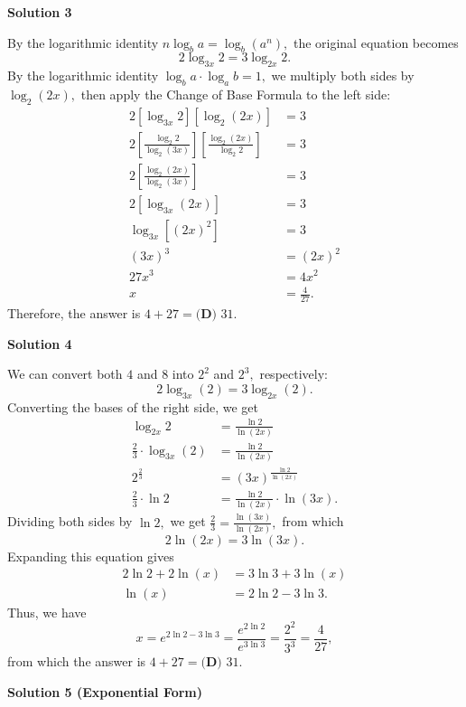\begin{enumerate}
\textbf{Solution 3}

By the logarithmic identity $n\log_b{a}=\log_b{\left(a^n\right)},$ the original equation becomes 
 \[2\log_{3x} 2 = 3\log_{2x} 2.\]By the logarithmic identity $\log_b{a}\cdot\log_a{b}=1,$ we multiply both sides by $\log_2{(2x)},$ then apply the Change of Base Formula to the left side:
 \begin{align*} 2\left[\log_{3x}2\right]\left[\log_2{(2x)}\right] &= 3 \\ 2\left[\frac{\log_2 2}{\log_2{(3x)}}\right]\left[\frac{\log_2{(2x)}}{\log_2 2}\right] &= 3 \\ 2\left[\frac{\log_2{(2x)}}{\log_2{(3x)}}\right] &=3 \\ 2\left[\log_{3x}{(2x)}\right] &= 3 \\ \log_{3x}{\left[(2x)^2\right]} &= 3 \\ (3x)^3&=(2x)^2 \\ 27x^3&=4x^2 \\ x&=\frac{4}{27}. \end{align*}
Therefore, the answer is $4+27=\boxed{\textbf{(D) } 31}.$




\textbf{Solution 4}

We can convert both $4$ and $8$ into $2^2$ and $2^3,$ respectively: 
 \[2\log_{3x} (2) = 3\log_{2x} (2).\]Converting the bases of the right side, we get
 \begin{align*} \log_{2x} 2 &= \frac{\ln 2}{\ln (2x)} \\ \frac{2}{3}\cdot\log_{3x} (2) &= \frac{\ln 2}{\ln (2x)} \\ 2^\frac{2}{3} &= (3x)^\frac{\ln 2}{\ln (2x)} \\ \frac{2}{3} \cdot \ln 2 &= \frac{\ln 2}{\ln (2x)} \cdot \ln (3x). \end{align*}
Dividing both sides by $\ln 2,$ we get $\frac{2}{3} = \frac{\ln (3x)}{\ln (2x)},$ from which 
 \[2\ln (2x) = 3\ln (3x).\]Expanding this equation gives
 \begin{align*} 2\ln 2 + 2\ln (x) &= 3\ln 3 + 3\ln (x) \\ \ln (x) &= 2\ln 2 - 3\ln 3. \end{align*}
Thus, we have 
 \[x = e^{2\ln 2 - 3\ln 3} = \frac{e^{2\ln 2}}{e^{3\ln 3}} = \frac{2^2}{3^3} = \frac{4}{27},\]from which the answer is $4+27=\boxed{\textbf{(D) } 31}.$




\textbf{Solution 5 (Exponential Form)}


\end{enumerate}
